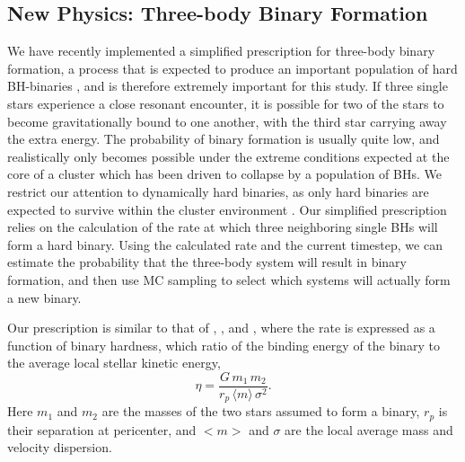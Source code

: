 \documentclass[12pt,preprint]{aastex}
\begin{document}



\subsection{New Physics: Three-body Binary Formation}

We have recently implemented a simplified prescription for three-body 
binary formation, a process that is expected to produce an important 
population of hard BH-binaries 
\citep{Kulkarni1993, Sigurdsson1993, PortegiesZwart2000,OLeary2006,  
Banerjee2010}, and is therefore extremely important for this study. 
If three single stars experience a close resonant encounter, it is possible for two
of the stars to become gravitationally bound to one another, with the third star 
carrying away the extra energy. The probability
of binary formation is usually quite low, and realistically only becomes possible 
under the extreme conditions expected at the core of a cluster which has been driven
to collapse by a population of BHs. We restrict our attention to 
dynamically hard binaries, as only hard binaries are expected to survive within the
cluster environment \citep{Heggie1975}.
Our simplified prescription relies on the calculation of the rate at which 
three neighboring single BHs will form a hard binary. Using the calculated rate
and the current timestep, we can estimate the probability that the three-body
 system will result in binary formation, and then use MC sampling to select which systems
  will actually form a new binary.

Our prescription is similar to that of 
\citet{Ivanova2005}, \citet{Ivanova2010}, and \citet{OLeary2006},
where the rate is expressed as a function of binary hardness,
which ratio of the binding energy of the binary to the average local stellar kinetic energy,
\begin{equation}
\eta = \frac{G \, m_1 \, m_2}{r_p \, \langle m \rangle \, \sigma^2}.
\label{eq:eta}
\end{equation}
Here $m_1$ and $m_2$ are the masses of the two stars assumed to
form a binary, $r_p$ is their separation at pericenter, and $<m>$  and $\sigma$ are
the local average mass and velocity dispersion.
\end{document}
